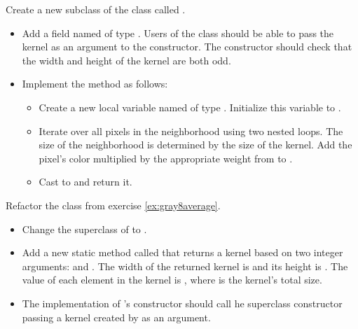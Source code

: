 \documentclass{book}
\begin{document}
\begin{exercise}\label{ex:convolution}
Create a new subclass of the class  called .
\begin{itemize}
  \item Add a field named  of type . Users of the class should be able to pass the kernel as an argument to the constructor. The constructor should check that the width and height of the kernel are both odd.
  \item Implement the method  as follows:
  \begin{itemize}
    \item Create a new  local variable named  of type . Initialize this variable to .
    \item Iterate over all pixels in the neighborhood using two nested  loops. The size of the neighborhood is determined by the size of the kernel. Add the pixel's color multiplied by the appropriate weight from  to .
    \item Cast  to  and return it.
  \end{itemize}
\end{itemize}
\end{exercise}

\begin{exercise}
Refactor the class  from exercise \ref{ex:gray8average}.
\begin{itemize}
  \item Change the superclass of  to .
  \item Add a new static method called  that returns a kernel based on two integer arguments:  and . The width of the returned kernel is  and its height is . The value of each element in the kernel is , where  is the kernel's total size.
  \item The implementation of 's constructor should call he superclass constructor passing a kernel created by  as an argument.
\end{itemize}
\end{exercise}
\end{document}
